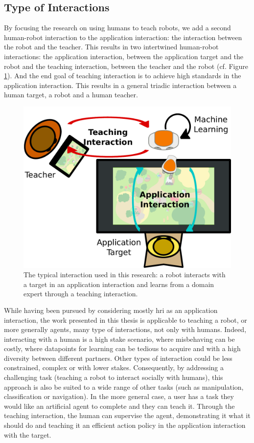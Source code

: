 \subsection{Type of Interactions}

By focusing the research on using humans to teach robots, we add a second human-robot interaction to the application interaction: the interaction between the robot and the teacher. This results in two intertwined human-robot interactions: the application interaction, between the application target and the robot and the teaching interaction, between the teacher and the robot (cf. Figure \ref{fig:intro_setup}). And the end goal of teaching interaction is to achieve high standards in the application interaction. This results in a general triadic interaction between a human target, a robot and a human teacher. 

\begin{figure}[ht]
	\includegraphics[width=.7\linewidth]{setup.pdf}
	\centering
	\caption{The typical interaction used in this research: a robot interacts with a target in an application interaction and learns from a domain expert through a teaching interaction.}
	\label{fig:intro_setup}
\end{figure}

While having been pursued by considering mostly \gls{hri} as an application interaction, the work presented in this thesis is applicable to teaching a robot, or more generally agents, many type of interactions, not only with humans. Indeed, interacting with a human is a high stake scenario, where misbehaving can be costly, where datapoints for learning can be tedious to acquire and with a high diversity between different partners. Other types of interaction could be less constrained, complex or with lower stakes. Consequently, by addressing a challenging task (teaching a robot to interact socially with humans), this approach is also be suited to a wide range of other tasks (such as manipulation, classification or navigation). In the more general case, a user has a task they would like an artificial agent to complete and they can teach it. Through the teaching interaction, the human can supervise the agent, demonstrating it what it should do and teaching it an efficient action policy in the application interaction with the target. 

